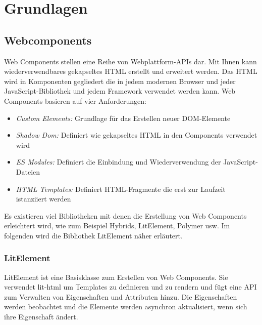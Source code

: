 \documentclass[12pt,					%
							 oneside,			%
							 a4paper,			%
							 halfparskip,		%
							 liststotoc,			%
							 bibtotoc,			%
							 fleqn,				%
							 pointlessnumbers]	%
							 {scrreprt}
\begin{document}
\chapter{Grundlagen}				
		\section{Webcomponents}
		Web Components stellen eine Reihe von Webplattform-APIs dar. Mit Ihnen kann wiederverwendbares gekapseltes HTML erstellt und erweitert werden. Das HTML wird in Komponenten gegliedert die in jedem modernen Browser und jeder JavaScript-Bibliothek und jedem Framework verwendet werden kann. Web Components basieren auf vier Anforderungen: 
\begin{itemize}
\item \textit{Custom Elements:} Grundlage für das Erstellen neuer DOM-Elemente
\item \textit{Shadow Dom:} Definiert wie gekapseltes HTML in den Components verwendet wird
\item \textit{ES Modules:} Definiert die Einbindung und Wiederverwendung der JavaScript-Dateien
\item \textit{HTML Templates:} Definiert HTML-Fragmente die erst zur Laufzeit istanziiert werden
\end{itemize} Es existieren viel Bibliotheken mit denen die Erstellung von Web Components erleichtert wird, wie zum Beispiel Hybrids, LitElement, Polymer usw. Im folgenden wird die Bibliothek LitElement näher erläutert.\cite{webcom}

				\subsection{LitElement}
				LitElement ist eine Basisklasse zum Erstellen von Web Components. Sie verwendet lit-html um Templates zu definieren und zu rendern und fügt eine API zum Verwalten von Eigenschaften und Attributen hinzu.  Die Eigenschaften werden beobachtet und die Elemente werden asynchron aktualisiert, wenn sich ihre Eigenschaft ändert. 

\end{document}
